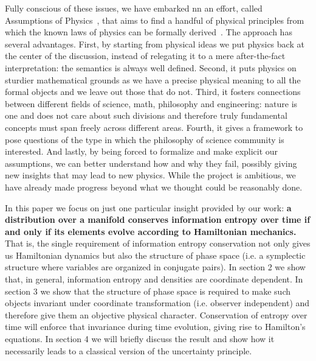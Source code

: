 \documentclass[11pt]{article}
\begin{document}
Fully conscious of these issues, we have embarked nn an effort, called Assumptions of Physics~\cite{carc1}, that aims to find a handful of physical principles from which the known laws of physics can be formally derived~\cite{carc2}. The approach has several advantages. First, by starting from physical ideas we put physics back at the center of the discussion, instead of relegating it to a mere after-the-fact interpretation: the semantics is always well defined. Second, it puts physics on sturdier mathematical grounds as we have a precise physical meaning to all the formal objects and we leave out those that do not. Third, it fosters connections between different fields of science, math, philosophy and engineering: nature is one and does not care about such divisions and therefore truly fundamental concepts must span freely across different areas. Fourth, it gives a framework to pose questions of the type in which the philosophy of science community is interested. And lastly, by being forced to formalize and make explicit our assumptions, we can better understand how and why they fail, possibly giving new insights that may lead to new physics. While the project is ambitious, we have already made progress beyond what we thought could be reasonably done.

In this paper we focus on just one particular insight provided by our work: \textbf{a distribution over a manifold conserves information entropy over time if and only if its elements evolve according to Hamiltonian mechanics.} That is, the single requirement of information entropy conservation not only gives us Hamiltonian dynamics but also the structure of phase space (i.e. a symplectic structure where variables are organized in conjugate pairs). In section 2 we show that, in general, information entropy and densities are coordinate dependent. In section 3 we show that the structure of phase space is required to make such objects invariant under coordinate transformation (i.e. observer independent) and therefore give them an objective physical character. Conservation of entropy over time will enforce that invariance during time evolution, giving rise to Hamilton's equations. In section 4 we will briefly discuss the result and show how it necessarily leads to a classical version of the uncertainty principle.
\end{document}
